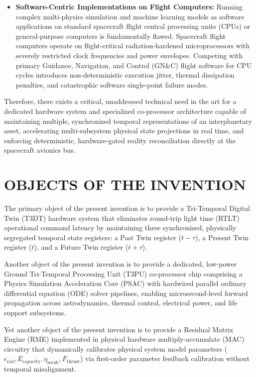 \documentclass[12pt,a4paper]{article}
\begin{document}
\begin{itemize}
    \item \textbf{Software-Centric Implementations on Flight Computers:} Running complex multi-physics simulation and machine learning models as software applications on standard spacecraft flight central processing units (CPUs) or general-purpose computers is fundamentally flawed. Spacecraft flight computers operate on flight-critical radiation-hardened microprocessors with severely restricted clock frequencies and power envelopes. Competing with primary Guidance, Navigation, and Control (GN\&C) flight software for CPU cycles introduces non-deterministic execution jitter, thermal dissipation penalties, and catastrophic software single-point failure modes.
\end{itemize}

Therefore, there exists a critical, unaddressed technical need in the art for a dedicated hardware system and specialized co-processor architecture capable of maintaining multiple, synchronized temporal representations of an interplanetary asset, accelerating multi-subsystem physical state projections in real time, and enforcing deterministic, hardware-gated reality reconciliation directly at the spacecraft avionics bus.

\section*{OBJECTS OF THE INVENTION}
The primary object of the present invention is to provide a Tri-Temporal Digital Twin (T3DT) hardware system that eliminates round-trip light time (RTLT) operational command latency by maintaining three synchronized, physically segregated temporal state registers: a Past Twin register ($t-\tau$), a Present Twin register ($t$), and a Future Twin register ($t+\tau$).

Another object of the present invention is to provide a dedicated, low-power Ground Tri-Temporal Processing Unit (T3PU) co-processor chip comprising a Physics Simulation Acceleration Core (PSAC) with hardwired parallel ordinary differential equation (ODE) solver pipelines, enabling microsecond-level forward propagation across astrodynamics, thermal control, electrical power, and life support subsystems.

Yet another object of the present invention is to provide a Residual Matrix Engine (RME) implemented in physical hardware multiply-accumulate (MAC) circuitry that dynamically calibrates physical system model parameters ($\epsilon_{\text{rad}}, E_{\text{capacity}}, \eta_{\text{scrub}}, F_{\text{thrust}}$) via first-order parameter feedback calibration without temporal misalignment.
\end{document}

